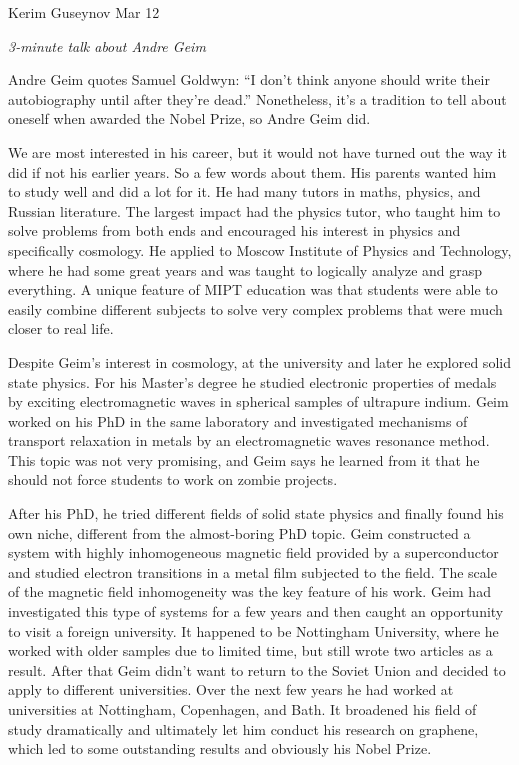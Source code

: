 \documentclass[a4paper, 12pt]{article}
\begin{document}
\noindent
Kerim Guseynov
\hfill
Mar 12

\begin{center}
	\textit{3-minute talk about Andre Geim}
\end{center}

Andre Geim quotes Samuel Goldwyn: ``I don’t think anyone should write 
their autobiography until after they’re dead.'' Nonetheless, it's 
a tradition to tell about oneself when awarded the Nobel Prize, so Andre 
Geim did.

We are most interested in his career, but it would not have turned out 
the way it did if not his earlier years. So a few words about them. His 
parents wanted him to study well and did a lot for it. He had many 
tutors in maths, physics, and Russian literature. The largest impact had 
the physics tutor, who taught him to solve problems from both ends and 
encouraged his interest in physics and specifically cosmology. He 
applied to Moscow Institute of Physics and Technology, where he had some 
great years and was taught to logically analyze and grasp everything. 
A unique feature of MIPT education was that students were able to easily 
combine different subjects to solve very complex problems that were much 
closer to real life.

Despite Geim's interest in cosmology, at the university and later 
he explored solid state physics. For his Master's degree he studied 
electronic properties of medals by exciting electromagnetic waves in 
spherical samples of ultrapure indium. Geim worked on his PhD in the 
same laboratory and investigated mechanisms of transport relaxation in 
metals by an electromagnetic waves resonance method. This topic was not 
very promising, and Geim says he learned from it that he should not 
force students to work on zombie projects.

After his PhD, he tried different fields of solid state physics and 
finally found his own niche, different from the almost-boring PhD topic. 
Geim constructed a system with highly inhomogeneous magnetic field 
provided by a superconductor and studied electron transitions in a metal 
film subjected to the field. The scale of the magnetic field 
inhomogeneity was the key feature of his work. Geim had investigated 
this type of systems for a few years and then caught an opportunity to 
visit a foreign university. It happened to be Nottingham University, 
where he worked with older samples due to limited time, but still wrote 
two articles as a result. After that Geim didn't want to return to the 
Soviet Union and decided to apply to different universities. Over the 
next few years he had worked at universities at Nottingham, Copenhagen, 
and Bath. It broadened his field of study dramatically and ultimately 
let him conduct his research on graphene, which led to some outstanding 
results and obviously his Nobel Prize.
\end{document}
